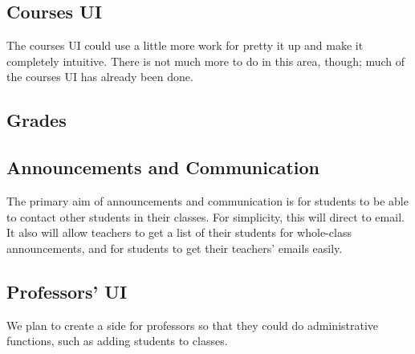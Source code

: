 \documentclass{article}
\begin{document}
\subsection{Courses UI}

The courses UI could use a little more work for pretty it up and make it
completely intuitive. There is not much more to do in this area, though; much
of the courses UI has already been done.

\subsection{Grades}

\subsection{Announcements and Communication}

The primary aim of announcements and communication is for students to be able
to contact other students in their classes. For simplicity, this will direct to
email. It also will allow teachers to get a list of their students for whole-class
announcements, and for students to get their teachers' emails easily.

\subsection{Professors' UI}

We plan to create a side for professors so that they could do administrative
functions, such as adding students to classes.

{} 
\end{document}
